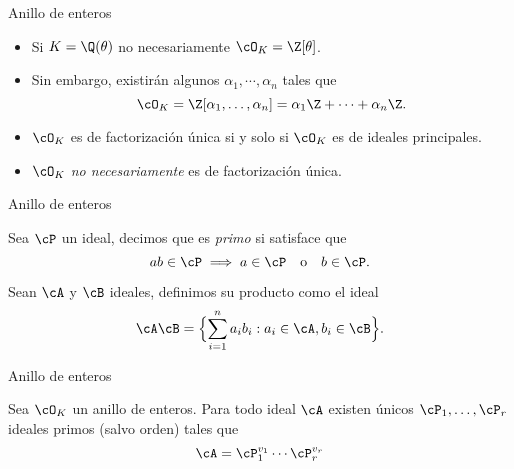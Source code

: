 \begin{frame}{Anillo de enteros}
  \begin{itemize}[<+->]
    \item Si $K = \Q(\theta)$ no necesariamente $\cO_K = \Z[\theta]$.
    \bigskip

    \item Sin embargo, existirán algunos $\alpha_1,\cdots,\alpha_n$ tales que
    \[
      \cO_K = \Z[\alpha_1,\ldots,\alpha_n] = \alpha_1\Z + \cdots +\alpha_n\Z.
    \]

    \item $\cO_K$ es de factorización única si y solo si $\cO_K$ es de ideales principales.
    \bigskip

    \item $\cO_K$ \emph{no necesariamente} es de factorización única.
  \end{itemize}
\end{frame}

\begin{frame}{Anillo de enteros}
  \begin{definition}
    Sea $\cP$ un ideal, decimos que es \emph{primo} si satisface que
    \[
      ab \in \cP \implies a \in \cP \eqor b \in \cP.
    \]
  \end{definition}

  \pause\bigskip
  \begin{definition}
    Sean $\cA$ y $\cB$ ideales, definimos su producto como el ideal
    \[
      \cA\cB = \Bigl\{ \sum_{i=1}^n a_i b_i :  a_i \in \cA,  b_i \in \cB \Bigr\}.
    \]
  \end{definition}
\end{frame}


\begin{frame}{Anillo de enteros}
  \begin{theorem}
    Sea $\cO_K$ un anillo de enteros. Para todo ideal $\cA$ existen únicos $\cP_1, \ldots, \cP_r$ ideales primos (salvo orden) tales que
    \[
      \cA = \cP_1^{v_1} \cdots \cP_r^{v_r}
    \]
  \end{theorem}
\end{frame}